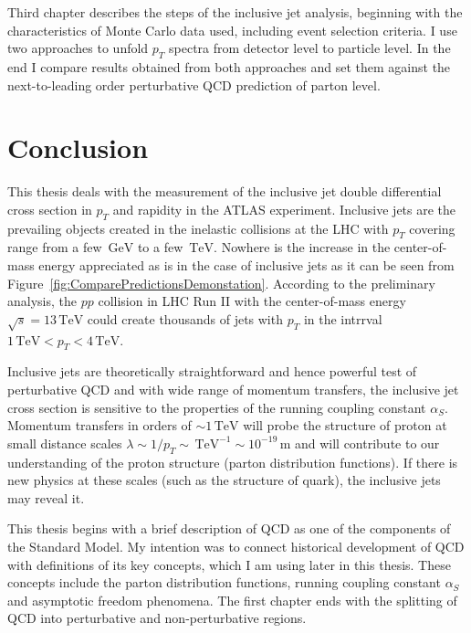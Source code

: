 \documentclass[a4paper,11pt,twoside,openright]{book}
\newcommand{\TeV}{\,\text{TeV}}
\newcommand{\GeV}{\,\text{GeV}}
\newcommand{\pt}{p_{T}}
\begin{document}
Third chapter describes the steps of the inclusive jet analysis, beginning with
the characteristics of Monte Carlo data used, including event selection 
criteria. I use two approaches to unfold $\pt$ spectra from
detector level to particle level. In the end I compare results obtained from
both approaches and set them against the next-to-leading order perturbative QCD
prediction of parton level.





\chapter*{Conclusion}

This thesis deals with the measurement of the inclusive jet double differential
cross section in $\pt$ and rapidity in the ATLAS experiment. Inclusive jets are
the prevailing objects created in the inelastic collisions at the LHC with $\pt$
covering range from a few $\GeV$ to a few $\TeV$. Nowhere is the increase in the
center-of-mass energy appreciated as is in the case of inclusive jets as it can
be seen from Figure~\ref{fig:ComparePredictionsDemonstation}. According to the
preliminary analysis, the $pp$ collision in LHC Run II with the center-of-mass
energy $\sqrt{s} = 13\TeV$ could create thousands of jets with $\pt$ in the
intrrval $1\TeV < \pt < 4\TeV$.

Inclusive jets are theoretically straightforward and hence powerful test of
perturbative QCD and with wide range of 
momentum transfers, the inclusive jet cross section is sensitive to the
properties of the running coupling constant $\alpha_S$.  Momentum transfers in
orders of $\sim 1 \TeV$ will probe the structure of proton at small distance
scales $\lambda \sim 1 / \pt \sim \TeV^{-1} \sim 10^{-19} \, \text{m}$ and will
contribute to our understanding of the proton structure (parton distribution
functions). If there is new physics at these scales (such as the
structure of quark), the inclusive jets may reveal it.

This thesis begins with a brief description of QCD as one of the components of
the Standard Model. My intention was to connect historical development of QCD
with definitions of its key concepts, which I am using later in this thesis.
These concepts include the parton distribution functions, running coupling
constant $\alpha_S$ and asymptotic freedom phenomena. The first chapter ends
with the splitting of QCD into perturbative and non-perturbative regions.
\end{document}

